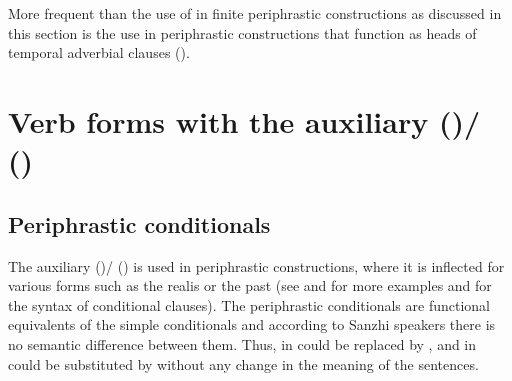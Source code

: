 More frequent than the use of  in finite periphrastic constructions as discussed in this section is the use in periphrastic constructions that function as heads of temporal adverbial clauses ().



\section[Verb forms with the auxiliary \protect\tit{b-irχʷ-} (\protect\tsc{ipfv})/\protect\tit{b-iχʷ-} (\protect\tsc{pfv})]{Verb forms with the auxiliary \protect{} (\protect{})/\protect{} (\protect{}) \protect{}}
\label{sec:Verb forms with the auxiliary b-irxw- (ipfv) / b-ixw- (pfv) be, become, be able}



\subsection{Periphrastic conditionals}
\label{ssec:Periphrastic conditionals}

The auxiliary  ()\slash{} ()  is used in periphrastic  constructions, where it is inflected for various  forms such as the realis   or the past   (see  and  for more examples and  for the syntax of conditional clauses). The periphrastic conditionals are functional equivalents of the simple conditionals and according to Sanzhi speakers there is no semantic difference between them. Thus, in   could be replaced by , and in   could be substituted by  without any change in the meaning of the sentences.


